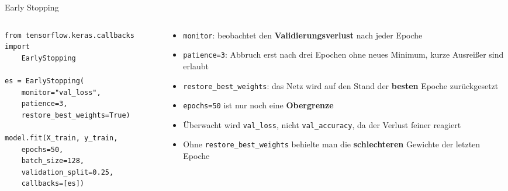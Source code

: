 \begin{frame}[fragile]{Early Stopping}
\footnotesize
\begin{columns}
\begin{column}{0.5\linewidth}
\begin{verbatim}
from tensorflow.keras.callbacks import 
    EarlyStopping

es = EarlyStopping(
    monitor="val_loss",
    patience=3,
    restore_best_weights=True)

model.fit(X_train, y_train,
    epochs=50,
    batch_size=128,
    validation_split=0.25,
    callbacks=[es])
\end{verbatim}
\end{column}
\begin{column}{0.45\linewidth}
\begin{itemize}
  \item \texttt{monitor}: beobachtet den \textbf{Validierungsverlust} nach jeder Epoche
  \item \texttt{patience=3}: Abbruch erst nach drei Epochen ohne neues Minimum, kurze Ausreißer sind erlaubt
  \item \texttt{restore\_best\_weights}: das Netz wird auf den Stand der \textbf{besten} Epoche zurückgesetzt
  \item \texttt{epochs=50} ist nur noch eine \textbf{Obergrenze}
  \item Überwacht wird \texttt{val\_loss}, nicht \texttt{val\_accuracy}, da der Verlust feiner reagiert
  \item Ohne \texttt{restore\_best\_weights} behielte man die \textbf{schlechteren} Gewichte der letzten Epoche
\end{itemize}
\end{column}
\end{columns}
\end{frame}

